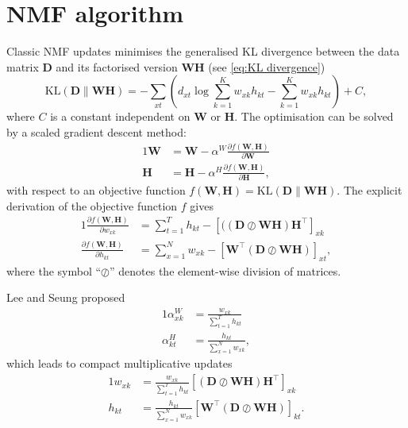 \chapter{NMF algorithm\label{app:NMF-algorithm}}

Classic NMF updates \cite{Lee2001} minimises the generalised KL divergence between the data matrix $\bm{D}$ and its factorised version $\bm{WH}$ (see \autoref{eq:KL divergence})
%
\begin{equation}
	\mbox{KL}(\bm{D}\parallel\bm{WH})=-\sum_{xt}\left(d_{xt}\log\sum_{k=1}^{K}w_{xk}h_{kt}-\sum_{k=1}^{K}w_{xk}h_{kt}\right)+C,
\end{equation}
where $C$ is a constant independent on $\bm{W}$ or $\bm{H}$. The optimisation can be solved by a scaled gradient descent method:
%
\begin{alignat}{1}
	\bm{W} & =\bm{W}-\alpha^{W}\frac{\partial f(\bm{W,H})}{\partial \bm{W}}\nonumber \\
	\bm{H} & =\bm{H}-\alpha^{H}\frac{\partial f(\bm{W,H})}{\partial \bm{H}},
	\label{eq:gradient descend}
\end{alignat}
%
with respect to an objective function $f(\bm{W,H})=\mbox{KL}(\bm{D}\parallel\bm{WH})$. The explicit derivation of the objective function $f$ gives
%
\begin{alignat}{1}
	\frac{\partial f(\bm{W,H})}{\partial w_{xk}} & =\sum_{t=1}^{T}h_{kt}-\left[((\bm{D}\oslash\bm{WH})\bm{H}^{\top}\right]_{xk}\nonumber \\
	\frac{\partial f(\bm{W,H})}{\partial h_{kt}} & =\sum_{x=1}^{N}w_{xk}-\left[\bm{W^{\top}}(\bm{D}\oslash\bm{WH})\right]_{xt},
	\label{eq:gradients}
\end{alignat}
%
where the symbol ``$\oslash$'' denotes the element-wise division of matrices. 

Lee and Seung \cite{Lee2001} proposed 
%
\begin{alignat}{1}
	\alpha_{xk}^{W} & =\frac{w_{xk}}{\sum_{t=1}^{T}h_{kt}}\nonumber \\
	\alpha_{kt}^{H} & =\frac{h_{kt}}{\sum_{x=1}^{N}w_{xk}},
	\label{eq:alphas}
\end{alignat}
%
which leads to compact multiplicative updates
%
\begin{alignat}{1}
	w_{xk} & =\frac{w_{xk}}{\sum_{t=1}^{T}h_{kt}}\left[(\bm{D}\oslash\bm{WH})\bm{H^{\top}}\right]_{xk}\nonumber \\
	h_{kt} & =\frac{h_{kt}}{\sum_{x=1}^{N}w_{xk}}\left[\bm{W^{\top}}(\bm{D}\oslash\bm{WH})\right]_{kt}.
	\label{eq:classic updates}
\end{alignat}
%

